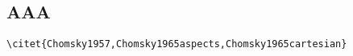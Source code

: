 % 
%  
%  
% 
% 
% 
% 
% 
%  
%  
% 
% 
% 
% 
% 
%  
%  
\subsection{AAA} 

\bigskip
\verb+\citet{Chomsky1957,Chomsky1965aspects,Chomsky1965cartesian}+

       \citet{Chomsky1957,Chomsky1965aspects,Chomsky1965cartesian} 
 
% 
% 
% 
%  
% 
% 
% 
% 
% 
% 
% 
% 
% 
